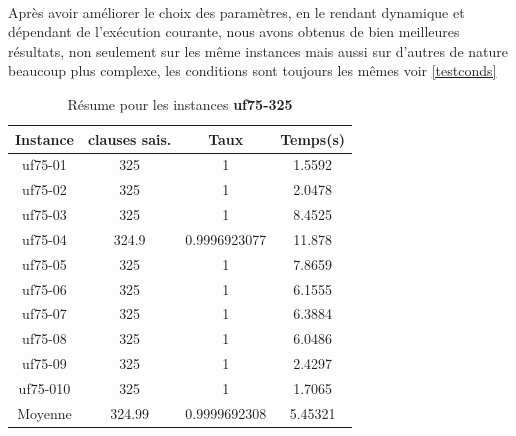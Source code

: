 	\paragraph{}
	Après avoir améliorer le choix des paramètres, en le rendant dynamique et dépendant de l'exécution courante, nous avons obtenus de bien meilleures résultats, non seulement sur les même instances mais aussi sur d'autres de nature beaucoup plus complexe, les conditions sont toujours les mêmes voir \ref{testconds}
	\begin{table}[H]
		\centering
		
		\begin{tabular}{|c|c|c|c|}
			\hline
			\textbf{Instance} & \textbf{clauses sais.} & \textbf{Taux} & \textbf{Temps(s)} \\ \hline
			uf75-01           & 325                    & 1             & 1.5592            \\ \hline
			uf75-02           & 325                    & 1             & 2.0478            \\ \hline
			uf75-03           & 325                    & 1             & 8.4525            \\ \hline
			uf75-04           & 324.9                  & 0.9996923077  & 11.878            \\ \hline
			uf75-05           & 325                    & 1             & 7.8659            \\ \hline
			uf75-06           & 325                    & 1             & 6.1555            \\ \hline
			uf75-07           & 325                    & 1             & 6.3884            \\ \hline
			uf75-08           & 325                    & 1             & 6.0486            \\ \hline
			uf75-09           & 325                    & 1             & 2.4297            \\ \hline
			uf75-010          & 325                    & 1             & 1.7065            \\ \hline
			Moyenne           & 324.99                 & 0.9999692308  & 5.45321           \\ \hline
		\end{tabular}
		\caption{Résume pour les instances \textbf{uf75-325}}
	\end{table}
	
	
	
